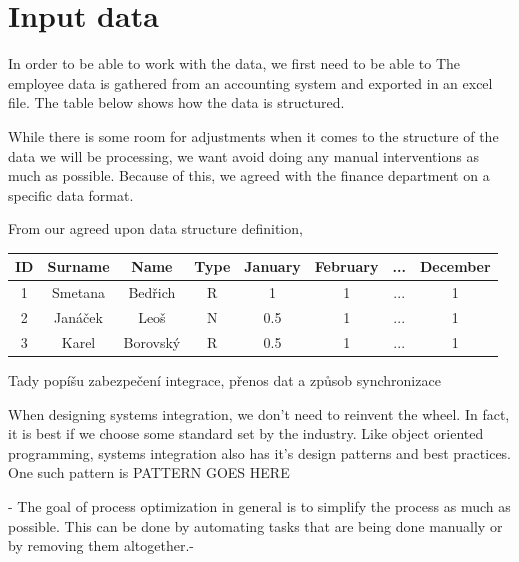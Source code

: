 \documentclass[12pt,oneside]{fithesis2}
\begin{document}
    
    \section{Input data}
    In order to be able to work with the data, we first need to be able to 
    The employee data is gathered from an accounting system and exported in an excel file. The table below shows how the data is structured.
    
    While there is some room for adjustments when it comes to the structure of the data we will be processing, we want avoid doing any manual interventions as much as possible. Because of this, we agreed with the finance department on a specific data format.
    
    From our agreed upon data structure definition, 
    \begin{center}
    \begin{tabular}{ |c|c|c|c|c|c|c|c| } 
    \hline
    ID & Surname & Name & Type & January & February & ... & December \\
    \hline
    1 & Smetana & Bedřich & R & 1 & 1 & ... & 1\\ 
    2 & Janáček & Leoš & N & 0.5 & 1 & ... & 1\\ 
    3 & Karel & Borovský & R & 0.5 & 1 & ... & 1\\ 
    \hline
    \end{tabular}
    \end{center}
    Tady popíšu zabezpečení integrace, přenos dat a způsob synchronizace
    
    When designing systems integration, we don't need to reinvent the wheel. In fact, it is best if we choose some standard set by the industry. Like object oriented programming, systems integration also has it's design patterns and best practices. One such pattern is PATTERN GOES HERE
    
    -
    The goal of process optimization in general is to simplify the process as much as possible. This can be done by automating tasks that are being done manually or by removing them altogether.-
    
    
    
\end{document}
